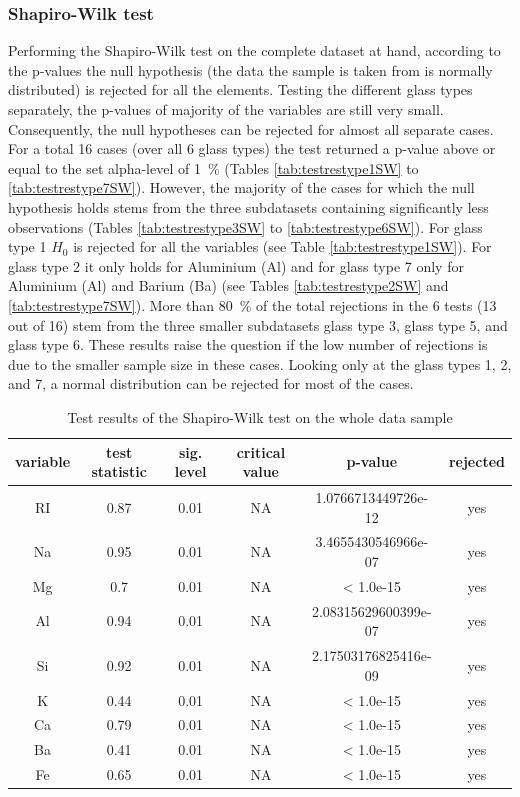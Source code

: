 \documentclass[a4paper, 12pt, titlepage, headsepline, listof = totoc, bibliography = totoc, numbers = noenddot]{scrartcl}
\begin{document}
\subsubsection{Shapiro-Wilk test}\label{sec:shapiro-original}
Performing the Shapiro-Wilk test on the complete dataset at hand, according to the p-values the null hypothesis (the data the sample is taken from is normally distributed) is rejected for all the elements.
Testing the different glass types separately, the p-values of majority of the variables are still very small. Consequently, the null hypotheses can be rejected for almost all separate cases. For a total 16 cases (over all 6 glass types) the test returned a p-value above or equal to the set alpha-level of 1\, \% (Tables \ref{tab:testrestype1SW} to \ref{tab:testrestype7SW}). However, the majority of the cases for which the null hypothesis holds stems from the three subdatasets containing significantly less observations (Tables \ref{tab:testrestype3SW} to \ref{tab:testrestype6SW}). For glass type 1 $H_0$ is rejected for all the variables (see Table \ref{tab:testrestype1SW}). For glass type 2 it only holds for Aluminium (Al) and for glass type 7 only for Aluminium (Al) and Barium (Ba) (see Tables \ref{tab:testrestype2SW} and \ref{tab:testrestype7SW}).
More than 80\, \% of the total rejections in the 6 tests (13 out of 16) stem from the three smaller subdatasets glass type 3, glass type 5, and glass type 6. These results raise the question if the low number of rejections is due to the smaller sample size in these cases. Looking only at the glass types 1, 2, and 7, a normal distribution can be rejected for most of the cases.



\begin{table}[h!]
\centering
\begin{tabular}{|cccccc|} \hline variable & test statistic & sig. level & critical value & p-value & rejected\\ \hline RI & 0.87 & 0.01 & NA & 1.0766713449726e-12 & yes\\ 
Na & 0.95 & 0.01 & NA & 3.4655430546966e-07 & yes\\ 
Mg & 0.7 & 0.01 & NA & < 1.0e-15 & yes\\ 
Al & 0.94 & 0.01 & NA & 2.08315629600399e-07 & yes\\ 
Si & 0.92 & 0.01 & NA & 2.17503176825416e-09 & yes\\ 
K & 0.44 & 0.01 & NA & < 1.0e-15 & yes\\ 
Ca & 0.79 & 0.01 & NA & < 1.0e-15 & yes\\ 
Ba & 0.41 & 0.01 & NA & < 1.0e-15 & yes\\ 
Fe & 0.65 & 0.01 & NA & < 1.0e-15 & yes\\ \hline \end{tabular}\caption{Test results of the Shapiro-Wilk test on the whole data sample}
\label{tab:testresFullSW}
\end{table}
\end{document}
